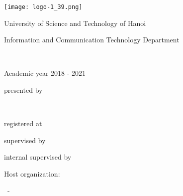 \newpage
\empty
\thispagestyle{empty}

\begin{center}






\texttt{[image: logo-1\_39.png]}


\vspace*{1cm} 



{\huge University of Science and Technology of Hanoi }\\


\vspace*{1cm} 


{\large Information and Communication Technology Department}\\


\vspace*{1cm} 



{\huge \MasterLevel }\\


\vspace*{1cm} 

{\large Academic year 2018 -  2021}


\vfill


\noindent\hrulefill

\vspace*{2mm} 

{\Large \bf \InternshipTitle }


\noindent\hrulefill





\vfill 



{\large presented by } \\

\vspace*{5mm} 


{\large \bf \FirstName~  \LastName} \\


\vspace*{5mm} 


{\large registered at \UniversityName } \\



\vspace*{5mm} 



{\large supervised by  \Supervisor } \\

\vspace*{5mm} 



{\large internal supervised by  \internalVisor } \\


\vspace*{20mm} 




{\large Host organization:   \HostOrganization }


\vspace*{5mm} 


{\large  \CityName~- \CountryName} \\



\end{center}
\flushbottom